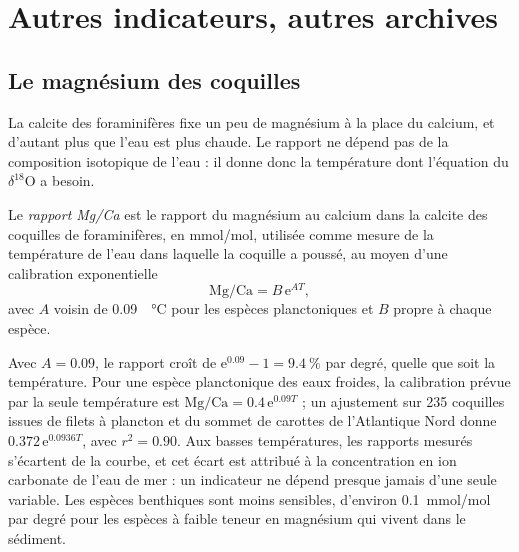 \section{Autres indicateurs, autres archives}\label{sec:b2:climate-proxies:others}

\subsection*{Le magnésium des coquilles}

La calcite des foraminifères fixe un peu de magnésium à la place du calcium, et d'autant plus que
l'eau est plus chaude. Le rapport ne dépend pas de la composition isotopique de l'eau : il donne donc la température
dont l'équation du $\delta^{18}$O a besoin.

\begin{definition}\label{def:b2:climate-proxies:mgca}
Le \emph{rapport Mg/Ca} est le rapport du magnésium au calcium dans
la calcite des coquilles de foraminifères, en \unit{mmol/mol}, utilisée comme mesure de la température de
l'eau dans laquelle la coquille a poussé, au moyen d'une calibration exponentielle
\[
  \text{Mg/Ca} = B\,\mathrm{e}^{A T},
\]
avec $A$ voisin de \qty{0.09}{\per\celsius} pour les espèces planctoniques et $B$ propre à chaque espèce.
\end{definition}

Avec $A = 0.09$, le rapport croît de $\mathrm{e}^{0.09} - 1 = \qty{9.4}{\percent}$ par degré,
quelle que soit la température. Pour une espèce planctonique des eaux froides, la calibration prévue par la seule
température est $\text{Mg/Ca} = 0.4\,\mathrm{e}^{0.09T}$ ; un ajustement sur 235 coquilles issues de filets à plancton
et du sommet de carottes de l'Atlantique Nord donne $0.372\,\mathrm{e}^{0.0936T}$, avec $r^2 = 0.90$.
Aux basses températures, les rapports mesurés s'écartent de la courbe, et cet écart est attribué à la
concentration en ion carbonate de l'eau de mer : un indicateur ne dépend presque jamais d'une seule variable.
Les espèces benthiques sont moins sensibles, d'environ \qty{0.1}{mmol/mol} par degré pour les espèces à faible
teneur en magnésium qui vivent dans le sédiment.

